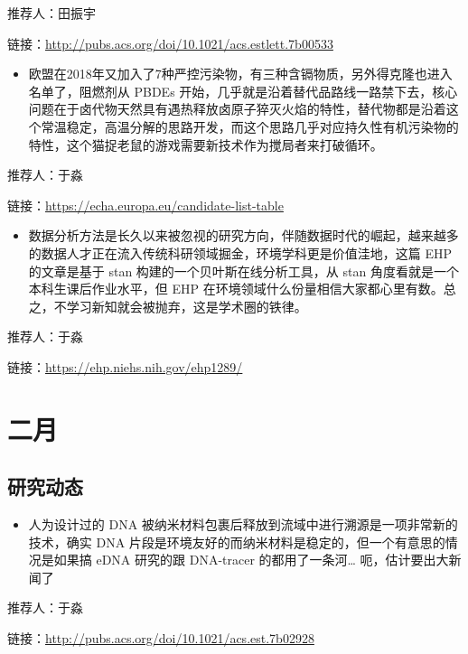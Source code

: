 \documentclass[]{book}
\providecommand{\tightlist}{%
  \setlength{\itemsep}{0pt}\setlength{\parskip}{0pt}}
\begin{document}
推荐人：田振宇

链接：\url{http://pubs.acs.org/doi/10.1021/acs.estlett.7b00533}

\begin{itemize}
\tightlist
\item
  欧盟在2018年又加入了7种严控污染物，有三种含镉物质，另外得克隆也进入名单了，阻燃剂从
  PBDEs
  开始，几乎就是沿着替代品路线一路禁下去，核心问题在于卤代物天然具有遇热释放卤原子猝灭火焰的特性，替代物都是沿着这个常温稳定，高温分解的思路开发，而这个思路几乎对应持久性有机污染物的特性，这个猫捉老鼠的游戏需要新技术作为搅局者来打破循环。
\end{itemize}

推荐人：于淼

链接：\url{https://echa.europa.eu/candidate-list-table}

\begin{itemize}
\tightlist
\item
  数据分析方法是长久以来被忽视的研究方向，伴随数据时代的崛起，越来越多的数据人才正在流入传统科研领域掘金，环境学科更是价值洼地，这篇
  EHP 的文章是基于 stan 构建的一个贝叶斯在线分析工具，从 stan
  角度看就是一个本科生课后作业水平，但 EHP
  在环境领域什么份量相信大家都心里有数。总之，不学习新知就会被抛弃，这是学术圈的铁律。
\end{itemize}

推荐人：于淼

链接：\url{https://ehp.niehs.nih.gov/ehp1289/}

\section*{二月}

\subsection*{研究动态}\label{-3}

\begin{itemize}
\tightlist
\item
  人为设计过的 DNA
  被纳米材料包裹后释放到流域中进行溯源是一项非常新的技术，确实 DNA
  片段是环境友好的而纳米材料是稳定的，但一个有意思的情况是如果搞 eDNA
  研究的跟 DNA-tracer 的都用了一条河\ldots{} 呃，估计要出大新闻了
\end{itemize}

推荐人：于淼

链接：\url{http://pubs.acs.org/doi/10.1021/acs.est.7b02928}
\end{document}
